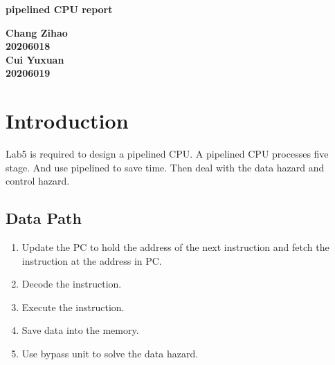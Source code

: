 \documentclass[12pt,a4paper]{article}
\begin{document}
\begin{titlepage}
  \begin{center}
    \vspace*{1cm}

    \textbf{\Huge pipelined CPU  report}

    \vspace{0.5cm}

         
    \vspace{1.5cm}

    \textbf{\large Chang Zihao \\20206018\\\large Cui Yuxuan\\20206019}

    \vfill
         

         
    \vspace{0.8cm}
  


         
\end{center}
\end{titlepage}


\newpage
\tableofcontents
\thispagestyle{empty}

\newpage
{}
\setcounter{page}{1}

\section{Introduction}

Lab5 is required to design a pipelined CPU.
A pipelined CPU processes five stage.
And use pipelined to save time.
Then deal with the data hazard and control hazard.

\subsection{Data Path}

\begin{enumerate}
\item Update the PC to hold the address of the next instruction and fetch the instruction at the address in PC.
\item Decode the instruction.
\item Execute the instruction.
\item Save data into the memory.
\item Use bypass unit to solve the data hazard.
\end{enumerate}
\end{document}
